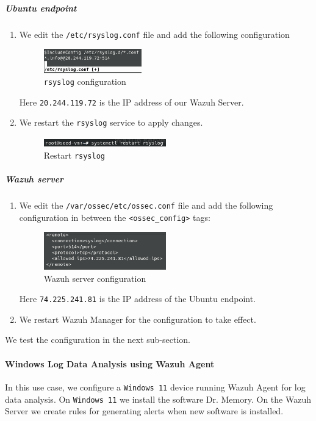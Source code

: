 \subparagraph{Ubuntu endpoint}
\begin{enumerate}
    \item We edit the \texttt{/etc/rsyslog.conf} file and add the following configuration
    \begin{figure} [H]
    \centering
    \includegraphics[width=0.4\textwidth]{images/log-data/1.png}
    \caption{\texttt{rsyslog} configuration}
    \end{figure}
    Here \texttt{20.244.119.72} is the IP address of our Wazuh Server.
    \item We restart the \texttt{rsyslog} service to apply changes.
    \begin{figure} [H]
    \centering
    \includegraphics[width=0.5\textwidth]{images/log-data/2.png}
    \caption{Restart \texttt{rsyslog}}
    \end{figure}
\end{enumerate}

\subparagraph{Wazuh server}
\begin{enumerate}
    \item We edit the \texttt{/var/ossec/etc/ossec.conf} file and add the following configuration in between the \texttt{<ossec\_config>} tags:
    \begin{figure} [H]
    \centering
    \includegraphics[width=0.5\textwidth]{images/log-data/3.png}
    \caption{Wazuh server configuration}
    \end{figure}
    Here \texttt{74.225.241.81} is the IP address of the Ubuntu endpoint.
    
    \item We restart Wazuh Manager for the configuration to take effect.
\end{enumerate}

We test the configuration in the next sub-section. 

\paragraph{Windows Log Data Analysis using Wazuh Agent}
In this use case, we configure a \texttt{Windows 11} device running Wazuh Agent for log data analysis. On \texttt{Windows 11} we install the software Dr. Memory. On the Wazuh Server we create rules for generating alerts when new software is installed.

